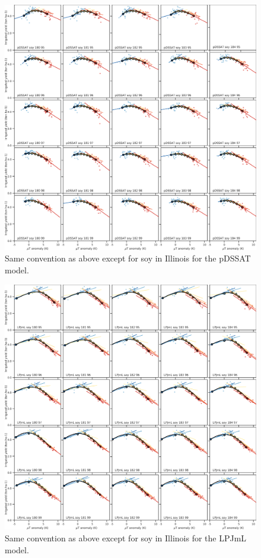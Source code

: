 \documentclass[10pt]{article}
\begin{document}
\begin{figure}[h!]
\centering
\includegraphics[width=\textwidth]{tempyearvclim_soy_pDSSAT.png}
\caption{Same convention as above except for soy in Illinois for the pDSSAT model.}
\label{fig:pdssatsoy}
\end{figure}

\begin{figure}[h!]
\centering
\includegraphics[width=\textwidth]{tempyearvclim_soy_LPJmL.png}
\caption{Same convention as above except for soy in Illinois for the LPJmL model.}
\label{fig:lpjmlsoy}
\end{figure}
\end{document}
